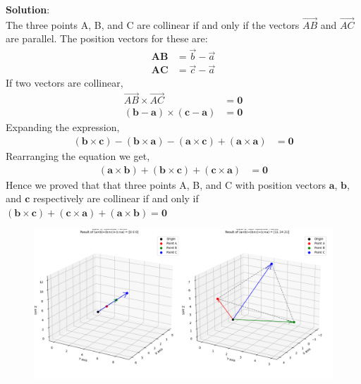 \documentclass[journal]{IEEEtran}
\begin{document}
\textbf{Solution}:\\
The three points A, B, and C are collinear if and only if the vectors $\vec{AB}$ and $\vec{AC}$ are parallel. The position vectors for these are:
\begin{align*}
    \mathbf{AB} &= \vec{b} - \vec{a} \\
    \mathbf{AC} &= \vec{c} - \vec{a}
\end{align*}
If two vectors are collinear,
\begin{align}
    \vec{AB} \times \vec{AC} &= \mathbf{0} \\
    (\mathbf{b} - \mathbf{a}) \times (\mathbf{c} - \mathbf{a}) &= \mathbf{0}
\end{align}
Expanding the expression,
\begin{align}
    (\mathbf{b} \times \mathbf{c}) - (\mathbf{b} \times \mathbf{a}) - (\mathbf{a} \times \mathbf{c}) + (\mathbf{a} \times \mathbf{a}) &= \mathbf{0} \label{eq:expanded}
\end{align}
Rearranging the equation we get,
\begin{align}
    (\mathbf{a} \times \mathbf{b}) + (\mathbf{b} \times \mathbf{c}) + (\mathbf{c} \times \mathbf{a}) &= \mathbf{0}
\end{align}
Hence we proved that that three points A, B, and C with position vectors $\mathbf{a}$, $\mathbf{b}$, and $\mathbf{c}$ respectively are collinear if and only if $(\mathbf{b} \times \mathbf{c}) + (\mathbf{c} \times \mathbf{a}) + (\mathbf{a} \times \mathbf{b}) = \mathbf{0}$
\begin{figure}[h!]
\begin{center}
\includegraphics[width=0.9\columnwidth]{figs/fig1.png}
\end{center}
\caption{}
\label{fig:Fig.1}
\end{figure}
\end{document}
